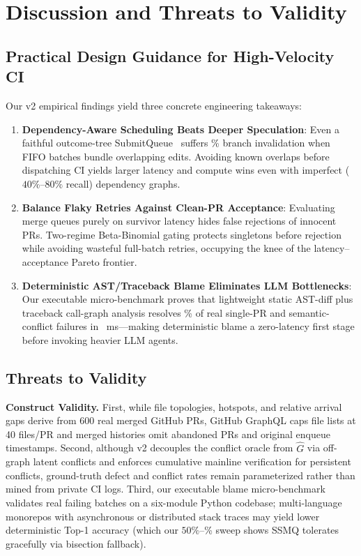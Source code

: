 \section{Discussion and Threats to Validity}
\label{sec:threats}

\subsection{Practical Design Guidance for High-Velocity CI}
Our v2 empirical findings yield three concrete engineering takeaways:
\begin{enumerate}
    \item \textbf{Dependency-Aware Scheduling Beats Deeper Speculation}: Even a faithful outcome-tree SubmitQueue~\cite{ananthanarayanan2019keeping} suffers \UberInvalidRatePct{}\% branch invalidation when FIFO batches bundle overlapping edits. Avoiding known overlaps before dispatching CI yields larger latency and compute wins even with imperfect ($40\%$--$80\%$ recall) dependency graphs.
    \item \textbf{Balance Flaky Retries Against Clean-PR Acceptance}: Evaluating merge queues purely on survivor latency hides false rejections of innocent PRs. Two-regime Beta-Binomial gating protects singletons before rejection while avoiding wasteful full-batch retries, occupying the knee of the latency--acceptance Pareto frontier.
    \item \textbf{Deterministic AST/Traceback Blame Eliminates LLM Bottlenecks}: Our executable micro-benchmark proves that lightweight static AST-diff plus traceback call-graph analysis resolves \BenchASTTopOnePct{}\% of real single-PR and semantic-conflict failures in \BenchASTMs{}~ms---making deterministic blame a zero-latency first stage before invoking heavier LLM agents.
\end{enumerate}

\subsection{Threats to Validity}
\textbf{Construct Validity.} First, while file topologies, hotspots, and relative arrival gaps derive from 600 real merged GitHub PRs, GitHub GraphQL caps file lists at 40 files/PR and merged histories omit abandoned PRs and original enqueue timestamps. Second, although v2 decouples the conflict oracle from $\hat{G}$ via off-graph latent conflicts and enforces cumulative mainline verification for persistent conflicts, ground-truth defect and conflict rates remain parameterized rather than mined from private CI logs. Third, our executable blame micro-benchmark validates \BenchTotalBatches{} real failing batches on a six-module Python codebase; multi-language monorepos with asynchronous or distributed stack traces may yield lower deterministic Top-1 accuracy (which our $50\%$--\BenchASTTopOnePct{}\% sweep shows SSMQ tolerates gracefully via bisection fallback).

